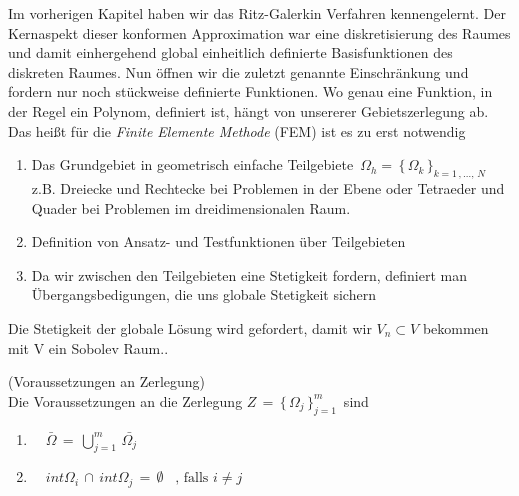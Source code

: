 Im vorherigen Kapitel haben wir das Ritz-Galerkin Verfahren kennengelernt. Der Kernaspekt dieser konformen Approximation war eine diskretisierung des Raumes und damit einhergehend global einheitlich definierte Basisfunktionen des diskreten Raumes. Nun öffnen wir die zuletzt genannte Einschränkung und fordern nur noch stückweise definierte Funktionen. Wo genau eine Funktion, in der Regel ein Polynom, definiert ist, hängt von unsererer Gebietszerlegung ab.
Das heißt für die \textit{Finite Elemente Methode} (FEM) ist es zu erst notwendig 
\begin{enumerate}
\item Das Grundgebiet in geometrisch einfache Teilgebiete $ \, \Omega_h = \, \{ \, \Omega_k \, \}_{k=1 \, , \dots, \, N} \, $ z.B. Dreiecke und Rechtecke bei Problemen in der Ebene oder Tetraeder und Quader bei Problemen im dreidimensionalen Raum.
\item Definition von Ansatz- und Testfunktionen über Teilgebieten 
\item Da wir zwischen den Teilgebieten eine Stetigkeit fordern, definiert man Übergangsbedigungen, die uns globale Stetigkeit sichern
\end{enumerate}
Die Stetigkeit der globale Lösung wird gefordert, damit wir $V_n \subset V$ bekommen mit V ein Sobolev Raum.\cite[175]{Numerik}. 


\begin{Bemerkung} (Voraussetzungen an Zerlegung) \cite[176]{Numerik} \\
Die Voraussetzungen an die Zerlegung $Z \, = \, \{  \, \Omega_j  \, \}_{j=1}^{m} \, $ sind 
\begin{enumerate}
\item \, \, $\bar{\Omega} \, = \,  \bigcup\limits_{j=1}^{m} \, \bar{\Omega_j}  $
\item  \, \, $int \Omega_i \, \cap \, int \Omega_j \, = \,  \emptyset  \, \, \, \text{ , falls } i \neq j $
\end{enumerate}
\end{Bemerkung}

